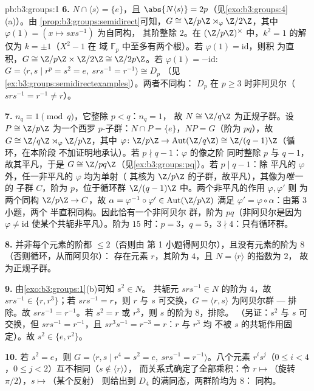 \begin{solution}{pb:b3:groups:1}
\textbf{6.} $N \cap \langle s \rangle = \{e\}$，且 $\abs{N\langle
s\rangle} = 2p$（见\cref{exo:b3:groups:4}(a)）。由
\cref{prop:b3:groups:semidirect}可知，$G \cong \Z/p\Z \rtimes_\varphi
\Z/2\Z$，其中 $\varphi(1) = (x \mapsto sxs^{-1})$ 为自同构，
其阶整除 $2$。在 $(\Z/p\Z)^\times$ 中，$k^2 = 1$ 的解仅为
$k = \pm 1$（$X^2 - 1$ 在
域 $\mathbb F_p$ 中至多有两个根）。若 $\varphi(1) = \mathrm{id}$，则积
为直积，$G \cong \Z/p\Z \times \Z/2\Z \cong \Z/2p\Z$。若
$\varphi(1) = -\mathrm{id}$: $G = \langle r, s \mid r^p = s^2 = e,
\ srs^{-1} = r^{-1}\rangle \cong D_p$
（见\cref{ex:b3:groups:semidirectexamples}）。两者不同构：
$D_p$ 在 $p \geq 3$ 时非阿贝尔（$srs^{-1} = r^{-1} \neq r$）。

\textbf{7.} $n_q \equiv 1 \pmod q$，它整除 $p < q$：$n_q = 1$，
故 $N \cong \Z/q\Z$ 为正规子群。设 $P \cong \Z/p\Z$ 为一个西罗
$p$-子群：$N \cap P = \{e\}$，$NP = G$（阶为 $pq$），故 $G
\cong \Z/q\Z \rtimes_\varphi \Z/p\Z$，其中 $\varphi \colon \Z/p\Z
\to \operatorname{Aut}(\Z/q\Z) \cong \Z/(q-1)\Z$（循环，在本阶段
不加证明地承认）。若 $p \nmid q - 1$：$\varphi$ 的像之阶
同时整除 $p$ 与 $q-1$，故其平凡，于是 $G \cong
\Z/pq\Z$（见\cref{ex:b3:groups:pq}）。若 $p \mid q - 1$：除
平凡的 $\varphi$ 外，任一非平凡的 $\varphi$ 均为单射（
其核为 $\Z/p\Z$ 的子群，故平凡），其像为\emph{唯一}的
子群 $C$，阶为 $p$，位于循环群
$\Z/(q-1)\Z$ 中。两个非平凡的作用 $\varphi, \varphi'$ 则
为两个同构 $\Z/p\Z \to C$，故 $\alpha =
\varphi^{-1}\circ\varphi' \in \operatorname{Aut}(\Z/p\Z)$
满足 $\varphi' = \varphi\circ\alpha$：由第 3 小题，两个
半直积同构。因此恰有一个非阿贝尔
群，阶为 $pq$（非阿贝尔是因为 $\varphi \neq
\mathrm{id}$ 使某个共轭非平凡）。阶为 $15$ 时：$p =
3$，$q = 5$，$3 \nmid 4$：只有循环群。

\textbf{8.} 并非每个元素的阶都 $\leq 2$（否则由
第 1 小题得阿贝尔），且没有元素的阶为 $8$（否则循环，从而阿贝尔）：
存在元素 $r$，其阶为 $4$，且 $N = \langle r\rangle$ 的指数为 $2$，
故为正规子群。

\textbf{9.} 由\cref{exo:b3:groups:1}(b)可知 $s^2 \in N$。
共轭元 $srs^{-1} \in N$ 的阶为 $4$，故 $srs^{-1} \in \{r,
r^3\}$；若 $srs^{-1} = r$，则 $r$ 与 $s$ 可交换，$G =
\langle r, s\rangle$ 为阿贝尔群 --- 排除。故 $srs^{-1} =
r^{-1}$。若 $s^2 = r$ 或 $r^3$，则 $s$ 的阶为 $8$，排除。
（另证：$s^2$ 与 $s$ 可交换，但 $s r s^{-1} =
r^{-1}$，且 $s r^3 s^{-1} = r^{-3} = r$：$r$ 与 $r^3$ 均
不被 $s$ 的共轭作用固定）。故 $s^2 \in \{e, r^2\}$。

\textbf{10.} 若 $s^2 = e$，则 $G = \langle r, s \mid r^4 = s^2 = e,\
srs^{-1} = r^{-1}\rangle$。八个元素 $r^is^j$（$0 \leq i
< 4$，$0 \leq j < 2$）互不相同（$s \notin \langle r\rangle$），
而关系式确定了全部乘积：令 $r
\mapsto$（旋转 $\pi/2$），$s \mapsto$（某个反射）
则给出到 $D_4$ 的满同态，两群阶均为 $8$：
同构。


\end{solution}
